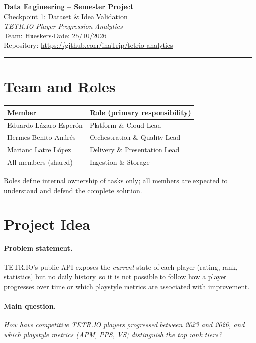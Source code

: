 \documentclass[11pt,a4paper]{article}
\newcommand{\projecttitle}{TETR.IO Player Progression Analytics}
\newcommand{\teamname}{Hueskers}
\newcommand{\submissiondate}{25/10/2026}
\newcommand{\repourl}{\url{https://github.com/inaTrip/tetrio-analytics}}
\begin{document}
\begin{center}
  {\Large\bfseries Data Engineering -- Semester Project}\\[4pt]
  {\large Checkpoint 1: Dataset \& Idea Validation}\\[8pt]
  {\large\itshape \projecttitle}\\[8pt]
  Team: \teamname \quad$\cdot$\quad Date: \submissiondate\\
  Repository: \repourl
\end{center}
\vspace{2mm}\hrule\vspace{4mm}

\section{Team and Roles}
\begin{tabularx}{\textwidth}{@{}lY@{}}
\toprule
\textbf{Member} & \textbf{Role (primary responsibility)} \\
\midrule
Eduardo Lázaro Esperón & Platform \& Cloud Lead \\
Hermes Benito Andrés   & Orchestration \& Quality Lead \\
Mariano Latre López    & Delivery \& Presentation Lead \\
All members (shared)   & Ingestion \& Storage \\
\bottomrule
\end{tabularx}

\medskip
\noindent Roles define internal ownership of tasks only; all members are
expected to understand and defend the complete solution.

\section{Project Idea}
\paragraph{Problem statement.}
TETR.IO's public API exposes the \emph{current} state of each player
(rating, rank, statistics) but no daily history, so it is not possible to
follow how a player progresses over time or which playstyle metrics are
associated with improvement.

\paragraph{Main question.}
\emph{How have competitive TETR.IO players progressed between 2023 and 2026,
and which playstyle metrics (APM, PPS, VS) distinguish the top rank tiers?}
\end{document}
